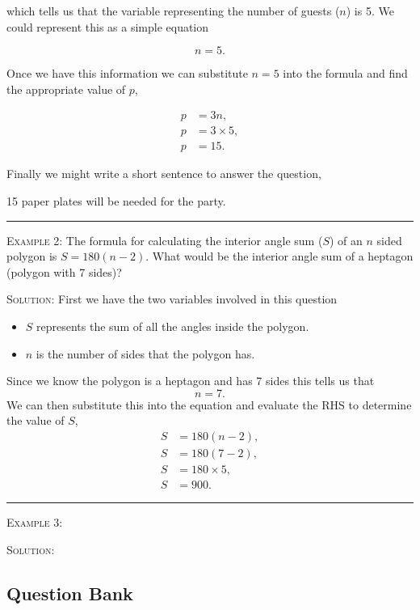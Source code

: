 \documentclass[a4paper,12pt]{article}
\begin{document}
which tells us that the variable representing the number 
of guests ($n$) is 5. We could represent this as a simple equation

$$n = 5.$$

Once we have this information we can substitute $n = 5$ into 
the formula and find the appropriate value of $p$,

\begin{align*}
p &= 3n, \\
p &= 3\times 5, \\
p &= 15.
\end{align*}

Finally we might write a short sentence to answer the question,

\begin{displayquote}
15 paper plates will be needed for the party.
\end{displayquote}

\vspace{3mm}
\hrule
\vspace{3mm}

\textsc{Example 2}: The formula for calculating the interior 
angle sum ($S$) of an $n$ sided polygon is $S = 180(n - 2)$.
What would be the interior angle sum of a heptagon (polygon with
7 sides)?

\textsc{Solution}: First we have the two variables involved
in this question
\begin{itemize}
\item $S$ represents the sum of all the angles inside the 
    polygon.
\item $n$ is the number of sides that the polygon has.
\end{itemize}
Since we know the polygon is a heptagon and has 7 sides 
this tells us that 
$$n = 7.$$
We can then substitute this into the equation and evaluate
the RHS to determine the value of $S$,
\begin{align*}
S &= 180(n - 2), \\
S &= 180(7 - 2), \\
S &= 180\times5, \\
S &= 900.
\end{align*}

\vspace{3mm}
\hrule
\vspace{3mm}

\textsc{Example 3}: 

\textsc{Solution}: 

\newpage
\subsection*{Question Bank}
\end{document}
